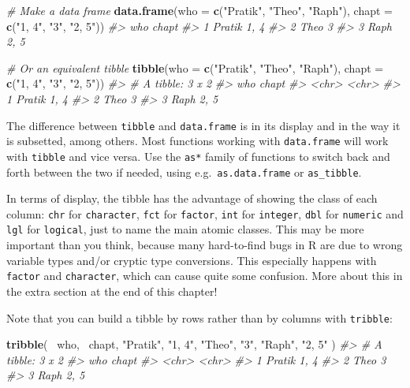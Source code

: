 \documentclass[]{book}
\newenvironment{Shaded}{}{}
\newcommand{\CommentTok}[1]{\textcolor[rgb]{0.38,0.63,0.69}{\textit{#1}}}
\newcommand{\DataTypeTok}[1]{\textcolor[rgb]{0.56,0.13,0.00}{#1}}
\newcommand{\KeywordTok}[1]{\textcolor[rgb]{0.00,0.44,0.13}{\textbf{#1}}}
\newcommand{\NormalTok}[1]{#1}
\newcommand{\OperatorTok}[1]{\textcolor[rgb]{0.40,0.40,0.40}{#1}}
\newcommand{\StringTok}[1]{\textcolor[rgb]{0.25,0.44,0.63}{#1}}
\begin{document}
\begin{Shaded}
\begin{Highlighting}[]
\CommentTok{# Make a data frame}
\KeywordTok{data.frame}\NormalTok{(}\DataTypeTok{who =} \KeywordTok{c}\NormalTok{(}\StringTok{"Pratik"}\NormalTok{, }\StringTok{"Theo"}\NormalTok{, }\StringTok{"Raph"}\NormalTok{), }\DataTypeTok{chapt =} \KeywordTok{c}\NormalTok{(}\StringTok{"1, 4"}\NormalTok{, }\StringTok{"3"}\NormalTok{, }\StringTok{"2, 5"}\NormalTok{))}
\CommentTok{#>      who chapt}
\CommentTok{#> 1 Pratik  1, 4}
\CommentTok{#> 2   Theo     3}
\CommentTok{#> 3   Raph  2, 5}

\CommentTok{# Or an equivalent tibble}
\KeywordTok{tibble}\NormalTok{(}\DataTypeTok{who =} \KeywordTok{c}\NormalTok{(}\StringTok{"Pratik"}\NormalTok{, }\StringTok{"Theo"}\NormalTok{, }\StringTok{"Raph"}\NormalTok{), }\DataTypeTok{chapt =} \KeywordTok{c}\NormalTok{(}\StringTok{"1, 4"}\NormalTok{, }\StringTok{"3"}\NormalTok{, }\StringTok{"2, 5"}\NormalTok{))}
\CommentTok{#> # A tibble: 3 x 2}
\CommentTok{#>   who    chapt}
\CommentTok{#>   <chr>  <chr>}
\CommentTok{#> 1 Pratik 1, 4 }
\CommentTok{#> 2 Theo   3    }
\CommentTok{#> 3 Raph   2, 5}
\end{Highlighting}
\end{Shaded}

The difference between \texttt{tibble} and \texttt{data.frame} is in its display and in the way it is subsetted, among others. Most functions working with \texttt{data.frame} will work with \texttt{tibble} and vice versa. Use the \texttt{as*} family of functions to switch back and forth between the two if needed, using e.g.~\texttt{as.data.frame} or \texttt{as\_tibble}.

In terms of display, the tibble has the advantage of showing the class of each column: \texttt{chr} for \texttt{character}, \texttt{fct} for \texttt{factor}, \texttt{int} for \texttt{integer}, \texttt{dbl} for \texttt{numeric} and \texttt{lgl} for \texttt{logical}, just to name the main atomic classes. This may be more important than you think, because many hard-to-find bugs in R are due to wrong variable types and/or cryptic type conversions. This especially happens with \texttt{factor} and \texttt{character}, which can cause quite some confusion. More about this in the extra section at the end of this chapter!

Note that you can build a tibble by rows rather than by columns with \texttt{tribble}:

\begin{Shaded}
\begin{Highlighting}[]
\KeywordTok{tribble}\NormalTok{(}
  \OperatorTok{~}\NormalTok{who, }\OperatorTok{~}\NormalTok{chapt,}
  \StringTok{"Pratik"}\NormalTok{, }\StringTok{"1, 4"}\NormalTok{,}
  \StringTok{"Theo"}\NormalTok{, }\StringTok{"3"}\NormalTok{,}
  \StringTok{"Raph"}\NormalTok{, }\StringTok{"2, 5"}
\NormalTok{)}
\CommentTok{#> # A tibble: 3 x 2}
\CommentTok{#>   who    chapt}
\CommentTok{#>   <chr>  <chr>}
\CommentTok{#> 1 Pratik 1, 4 }
\CommentTok{#> 2 Theo   3    }
\CommentTok{#> 3 Raph   2, 5}
\end{Highlighting}
\end{Shaded}
\end{document}
